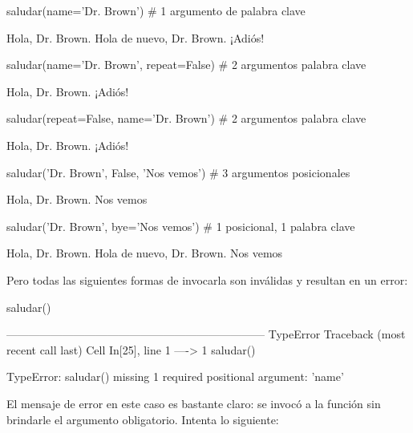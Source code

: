 \begin{pyin}
saludar(name='Dr. Brown')   # 1 argumento de palabra clave
\end{pyin}
\begin{pyprint}
Hola, Dr. Brown.
Hola de nuevo, Dr. Brown.
¡Adiós!
\end{pyprint}

\begin{pyin}
saludar(name='Dr. Brown', repeat=False) # 2 argumentos palabra clave
\end{pyin}
\begin{pyprint}
Hola, Dr. Brown.
¡Adiós!
\end{pyprint}

\begin{pyin}
saludar(repeat=False, name='Dr. Brown') # 2 argumentos palabra clave
\end{pyin}
\begin{pyprint}
Hola, Dr. Brown.
¡Adiós!
\end{pyprint}

\begin{pyin}
saludar('Dr. Brown', False, 'Nos vemos') # 3 argumentos posicionales
\end{pyin}
\begin{pyprint}
Hola, Dr. Brown.
Nos vemos
\end{pyprint}

\begin{pyin}
saludar('Dr. Brown', bye='Nos vemos') # 1 posicional, 1 palabra clave
\end{pyin}
\begin{pyprint}
Hola, Dr. Brown.
Hola de nuevo, Dr. Brown.
Nos vemos
\end{pyprint}

Pero todas las siguientes formas de invocarla son inválidas y resultan en un error:

\begin{pyin}
saludar()
\end{pyin}
\begin{pyerror}
---------------------------------------------------------------------
TypeError                           Traceback (most recent call last)
Cell In[25], line 1
----> 1 saludar()

TypeError: saludar() missing 1 required positional argument: 'name'
\end{pyerror}
El mensaje de error en este caso es bastante claro: se invocó a la función sin brindarle el argumento obligatorio. Intenta lo siguiente:

